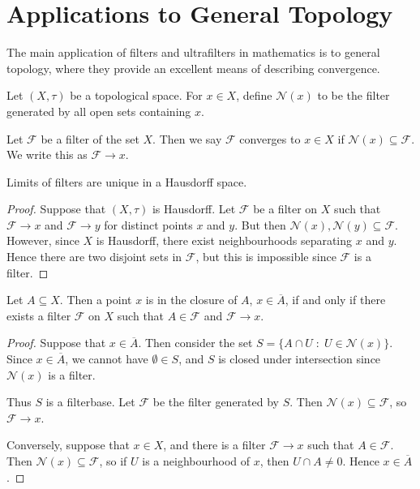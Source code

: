 \documentclass{owmaths}
\begin{document}
\section{Applications to General Topology}
The main application of filters and ultrafilters in mathematics is to 
general topology, where they provide an excellent means of describing convergence.

Let $(X,\tau)$ be a topological space. For $x \in X$, define
$\mathcal{N}(x)$ to be the filter generated by all open sets containing $x$.

\begin{definition}
    Let $\mathcal{F}$ be a filter of the set $X$. Then we say $\mathcal{F}$
    converges to $x \in X$ if $\mathcal{N}(x) \subseteq \mathcal{F}$. We
    write this as $\mathcal{F} \rightarrow x$.
\end{definition}

\begin{proposition}
    Limits of filters are unique in a Hausdorff space.
\end{proposition}
\begin{proof}
    Suppose that $(X,\tau)$ is Hausdorff. Let $\mathcal{F}$
    be a filter on $X$ such that $\mathcal{F} \rightarrow x$
    and $\mathcal{F}\rightarrow y$ for distinct points
    $x$ and $y$. But then $\mathcal{N}(x), \mathcal{N}(y) \subseteq \mathcal{F}$.
    However, since $X$ is Hausdorff, there exist neighbourhoods separating
    $x$ and $y$. Hence there are two disjoint sets in $\mathcal{F}$,
    but this is impossible since $\mathcal{F}$ is a filter.
\end{proof} 

\begin{proposition}
    Let $A \subseteq X$. Then a point $x$ is in the closure of $A$,
    $x \in \overline{A}$, if and only if there exists
    a filter $\mathcal{F}$ on $X$ such that $A \in \mathcal{F}$
    and $\mathcal{F} \rightarrow x$. 
\end{proposition}
\begin{proof}
    Suppose that $x \in \overline{A}$. Then consider
    the set $S = \{A \cap U\;:\;U \in \mathcal{N}(x)\}$. Since
    $x \in \overline{A}$, we cannot have $\emptyset \in S$,
    and $S$ is closed under intersection since $\mathcal{N}(x)$
    is a filter. 
    
    Thus $S$ is a filterbase. Let $\mathcal{F}$ be the filter
    generated by $S$. Then $\mathcal{N}(x) \subseteq \mathcal{F}$,
    so $\mathcal{F} \rightarrow x$.
    
    Conversely, suppose that $x \in X$, and there is a filter
    $\mathcal{F} \rightarrow x$ such that $A \in \mathcal{F}$. 
    Then $\mathcal{N}(x) \subseteq \mathcal{F}$, 
    so if $U$ is a neighbourhood of $x$, then $U\cap A \neq 0$. 
    Hence $x \in \overline{A}$.
\end{proof}
\end{document}
